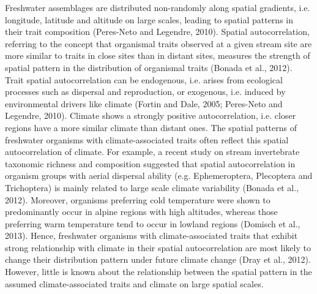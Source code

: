Freshwater assemblages are distributed non-randomly along spatial gradients, i.e. longitude, latitude and altitude on large scales, leading to spatial patterns in their trait composition (Peres-Neto and Legendre, 2010). Spatial autocorrelation, referring to the concept that organismal traits observed at a given stream site are more similar to traits in close sites than in distant sites, measures the strength of spatial pattern in the distribution of organismal traits (Bonada et al., 2012). Trait spatial autocorrelation can be endogenous, i.e. arises from ecological processes such as dispersal and reproduction, or exogenous, i.e. induced by environmental drivers like climate (Fortin and Dale, 2005; Peres-Neto and Legendre, 2010). Climate shows a strongly positive autocorrelation, i.e. closer regions have a more similar climate than distant ones. The spatial patterns of freshwater organisms with climate-associated traits often reflect this spatial autocorrelation of climate. For example, a recent study on stream invertebrate taxonomic richness and composition suggested that spatial autocorrelation in organism groups with aerial dispersal ability (e.g. Ephemeroptera, Plecoptera and Trichoptera) is mainly related to large scale climate variability (Bonada et al., 2012). Moreover, organisms preferring cold temperature were shown to predominantly occur in alpine regions with high altitudes, whereas those preferring warm temperature tend to occur in lowland regions (Domisch et al., 2013). Hence, freshwater organisms with climate-associated traits that exhibit strong relationship with climate in their spatial autocorrelation are most likely to change their distribution pattern under future climate change (Dray et al., 2012). However, little is known about the relationship between the spatial pattern in the assumed climate-associated traits and climate on large spatial scales.

